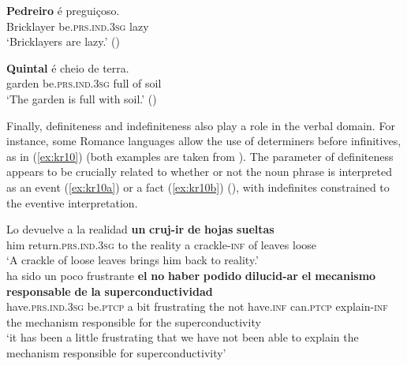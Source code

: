 \documentclass[output=paper,colorlinks,citecolor=brown]{langscibook}
\begin{document}
\ea\label{ex:kr8}
    \gll \textbf{Pedreiro} é preguiçoso.\\
     Bricklayer be.\textsc{prs.ind.3sg} lazy \\
    \glt ‘Bricklayers are lazy.’ (\citealt[108]{Dobrovie-SorinPires2008}) \\
\z

\ea\label{ex:kr9}
    \gll \textbf{Quintal} é cheio de terra.\\
     garden be.\textsc{prs.ind.3sg} full of soil \\
    \glt ‘The garden is full with soil.’ (\citealt[236]{Wall2013}) \\
\z

Finally, definiteness and indefiniteness also play a role in the verbal domain. For instance, some Romance languages allow the use of determiners before infinitives, as in (\ref{ex:kr10}) (both examples are taken from \cite{Rosemeyer2012}). The parameter of definiteness appears to be crucially related to whether or not the noun phrase is interpreted as an event (\ref{ex:kr10a}) or a fact (\ref{ex:kr10b}) (\citealt{Varela1979, DeMiguel1996, DemonteVarela1996, Vanderschueren2013, Schirakowski2021}), with indefinites constrained to the eventive interpretation.

\ea\label{ex:kr10} 
    \ea\label{ex:kr10a} 
\gll Lo devuelve a la realidad \textbf{un} \textbf{cruj-ir} \textbf{de} \textbf{hojas} \textbf{sueltas}\\
     him return.\textsc{prs.ind.3sg} to the reality a crackle-\textsc{inf} of leaves loose\\
\glt ‘A crackle of loose leaves brings him back to reality.’\\
    \ex\label{ex:kr10b} 
\gll ha sido un poco frustrante \textbf{el} \textbf{no} \textbf{haber} \textbf{podido} \textbf{dilucid-ar} \textbf{el} \textbf{mecanismo} \textbf{responsable} \textbf{de} \textbf{la} \textbf{superconductividad}\\
    have.\textsc{prs.ind.3sg} be.\textsc{ptcp} a bit frustrating the not have.\textsc{inf} can.\textsc{ptcp} explain-\textsc{inf} the mechanism responsible for the superconductivity \\
\glt ‘it has been a little frustrating that we have not been able to explain the mechanism responsible for superconductivity’
\z
\z
\end{document}
